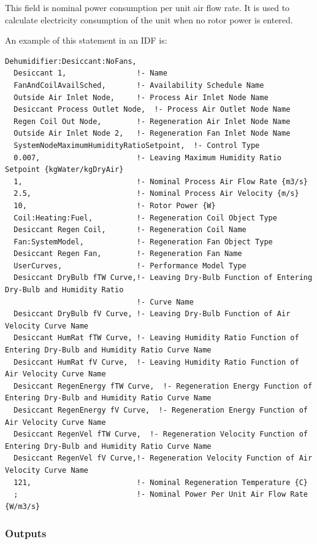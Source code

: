 This field is nominal power consumption per unit air flow rate. It is used to calculate electricity consumption of the unit when no rotor power is entered.

An example of this statement in an IDF is:

\begin{lstlisting}
Dehumidifier:Desiccant:NoFans,
  Desiccant 1,                !- Name
  FanAndCoilAvailSched,       !- Availability Schedule Name
  Outside Air Inlet Node,     !- Process Air Inlet Node Name
  Desiccant Process Outlet Node,  !- Process Air Outlet Node Name
  Regen Coil Out Node,        !- Regeneration Air Inlet Node Name
  Outside Air Inlet Node 2,   !- Regeneration Fan Inlet Node Name
  SystemNodeMaximumHumidityRatioSetpoint,  !- Control Type
  0.007,                      !- Leaving Maximum Humidity Ratio Setpoint {kgWater/kgDryAir}
  1,                          !- Nominal Process Air Flow Rate {m3/s}
  2.5,                        !- Nominal Process Air Velocity {m/s}
  10,                         !- Rotor Power {W}
  Coil:Heating:Fuel,          !- Regeneration Coil Object Type
  Desiccant Regen Coil,       !- Regeneration Coil Name
  Fan:SystemModel,            !- Regeneration Fan Object Type
  Desiccant Regen Fan,        !- Regeneration Fan Name
  UserCurves,                 !- Performance Model Type
  Desiccant DryBulb fTW Curve,!- Leaving Dry-Bulb Function of Entering Dry-Bulb and Humidity Ratio
                              !- Curve Name
  Desiccant DryBulb fV Curve, !- Leaving Dry-Bulb Function of Air Velocity Curve Name
  Desiccant HumRat fTW Curve, !- Leaving Humidity Ratio Function of Entering Dry-Bulb and Humidity Ratio Curve Name
  Desiccant HumRat fV Curve,  !- Leaving Humidity Ratio Function of Air Velocity Curve Name
  Desiccant RegenEnergy fTW Curve,  !- Regeneration Energy Function of Entering Dry-Bulb and Humidity Ratio Curve Name
  Desiccant RegenEnergy fV Curve,  !- Regeneration Energy Function of Air Velocity Curve Name
  Desiccant RegenVel fTW Curve,  !- Regeneration Velocity Function of Entering Dry-Bulb and Humidity Ratio Curve Name
  Desiccant RegenVel fV Curve,!- Regeneration Velocity Function of Air Velocity Curve Name
  121,                        !- Nominal Regeneration Temperature {C}
  ;                           !- Nominal Power Per Unit Air Flow Rate {W/m3/s}
\end{lstlisting}

\subsubsection{Outputs}\label{outputs-008}

